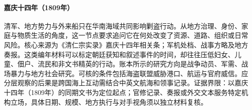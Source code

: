 \hypertarget{social:EQ-1809-SOUTH-CHINA-SEA-CAMPAIGN}{}\paragraph{嘉庆十四年（1809年）}清军、地方势力与外来船只在华南海域共同影响剿盗行动。从地方治理、身份、家庭与物质生活的角度，这一节点要求追问它在何处改变了资源、道路、组织或日常风险。核心来源为《清仁宗实录》嘉庆十四年相关条；军机处档、战事方略及地方奏报。这类编年材料可以标定朝廷获知和叙述事件的时间，却往往压低妇女、儿童、佃户、流民和非文书精英的行动。账本所示的研究方向是战争动员、军需、战场暴力与地方社会研究。可核的条件包括海盗联盟威胁港口、航运与官府威信。应分层观察的后果是跨国海上互动需结合中英文航海和领事记录。证据界限：以嘉庆十四年（1809年）的同期文书为定位起点；官修记录、奏报或外交文本服务特定机构立场，具体日期、规模、地方执行与对手视角须以独立材料复核。
